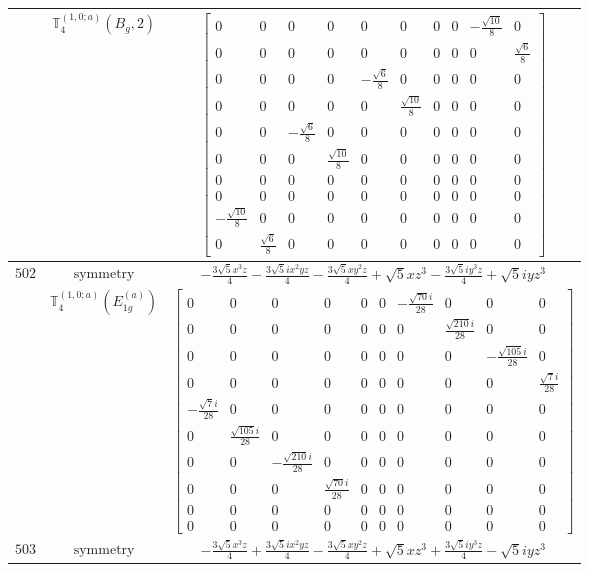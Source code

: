 \documentclass[fleqn,8pt,landscape]{jsarticle}
\begin{document}
\begin{longtable}{ccc}
$  $ & $ \mathbb{T}_{4}^{(1,0;a)}(B_{g},2) $ & $ \begin{bmatrix} 0 & 0 & 0 & 0 & 0 & 0 & 0 & 0 & - \frac{\sqrt{10}}{8} & 0 \\ 0 & 0 & 0 & 0 & 0 & 0 & 0 & 0 & 0 & \frac{\sqrt{6}}{8} \\ 0 & 0 & 0 & 0 & - \frac{\sqrt{6}}{8} & 0 & 0 & 0 & 0 & 0 \\ 0 & 0 & 0 & 0 & 0 & \frac{\sqrt{10}}{8} & 0 & 0 & 0 & 0 \\ 0 & 0 & - \frac{\sqrt{6}}{8} & 0 & 0 & 0 & 0 & 0 & 0 & 0 \\ 0 & 0 & 0 & \frac{\sqrt{10}}{8} & 0 & 0 & 0 & 0 & 0 & 0 \\ 0 & 0 & 0 & 0 & 0 & 0 & 0 & 0 & 0 & 0 \\ 0 & 0 & 0 & 0 & 0 & 0 & 0 & 0 & 0 & 0 \\ - \frac{\sqrt{10}}{8} & 0 & 0 & 0 & 0 & 0 & 0 & 0 & 0 & 0 \\ 0 & \frac{\sqrt{6}}{8} & 0 & 0 & 0 & 0 & 0 & 0 & 0 & 0 \end{bmatrix} $ \\ \hline
$ 502 $ & $ \text{symmetry} $ & $ - \frac{3 \sqrt{5} x^{3} z}{4} - \frac{3 \sqrt{5} i x^{2} y z}{4} - \frac{3 \sqrt{5} x y^{2} z}{4} + \sqrt{5} x z^{3} - \frac{3 \sqrt{5} i y^{3} z}{4} + \sqrt{5} i y z^{3} $ \\
$  $ & $ \mathbb{T}_{4}^{(1,0;a)}(E_{1g}^{(a)}) $ & $ \begin{bmatrix} 0 & 0 & 0 & 0 & 0 & 0 & - \frac{\sqrt{70} i}{28} & 0 & 0 & 0 \\ 0 & 0 & 0 & 0 & 0 & 0 & 0 & \frac{\sqrt{210} i}{28} & 0 & 0 \\ 0 & 0 & 0 & 0 & 0 & 0 & 0 & 0 & - \frac{\sqrt{105} i}{28} & 0 \\ 0 & 0 & 0 & 0 & 0 & 0 & 0 & 0 & 0 & \frac{\sqrt{7} i}{28} \\ - \frac{\sqrt{7} i}{28} & 0 & 0 & 0 & 0 & 0 & 0 & 0 & 0 & 0 \\ 0 & \frac{\sqrt{105} i}{28} & 0 & 0 & 0 & 0 & 0 & 0 & 0 & 0 \\ 0 & 0 & - \frac{\sqrt{210} i}{28} & 0 & 0 & 0 & 0 & 0 & 0 & 0 \\ 0 & 0 & 0 & \frac{\sqrt{70} i}{28} & 0 & 0 & 0 & 0 & 0 & 0 \\ 0 & 0 & 0 & 0 & 0 & 0 & 0 & 0 & 0 & 0 \\ 0 & 0 & 0 & 0 & 0 & 0 & 0 & 0 & 0 & 0 \end{bmatrix} $ \\ \hline
$ 503 $ & $ \text{symmetry} $ & $ - \frac{3 \sqrt{5} x^{3} z}{4} + \frac{3 \sqrt{5} i x^{2} y z}{4} - \frac{3 \sqrt{5} x y^{2} z}{4} + \sqrt{5} x z^{3} + \frac{3 \sqrt{5} i y^{3} z}{4} - \sqrt{5} i y z^{3} $ \\

\end{longtable}
\end{document}
